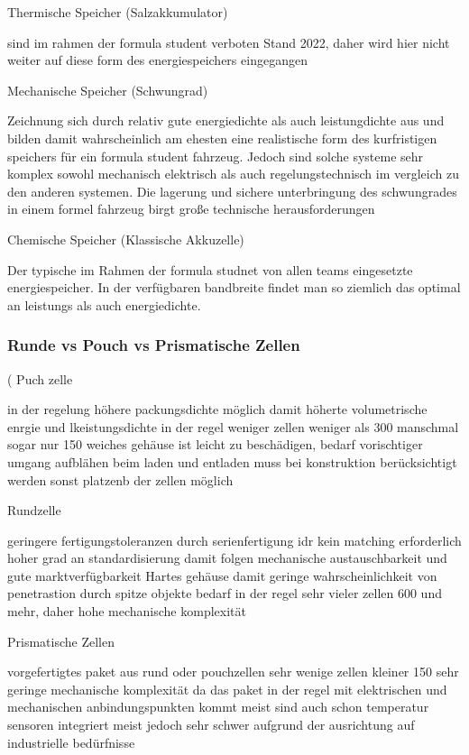 Thermische Speicher (Salzakkumulator)

	sind im rahmen der formula student verboten Stand 2022, daher wird hier nicht weiter auf diese form des energiespeichers eingegangen

Mechanische Speicher (Schwungrad)

	Zeichnung sich durch relativ gute energiedichte als auch leistungdichte aus und bilden damit wahrscheinlich am ehesten eine realistische form des kurfristigen speichers für ein formula student fahrzeug. Jedoch sind solche systeme sehr komplex sowohl mechanisch elektrisch als auch regelungstechnisch im vergleich zu den anderen systemen. Die lagerung und sichere unterbringung des schwungrades in einem formel fahrzeug birgt große technische herausforderungen

Chemische Speicher (Klassische Akkuzelle)

	Der typische im Rahmen der formula studnet von allen teams eingesetzte energiespeicher. In der verfügbaren bandbreite findet man so ziemlich das optimal an leistungs als auch energiedichte.

\subsubsection{Runde vs Pouch vs Prismatische Zellen}
(
	Puch zelle

in der regelung höhere packungsdichte möglich damit höherte volumetrische enrgie und lkeistungsdichte
in der regel weniger zellen weniger als 300 manschmal sogar nur 150
weiches gehäuse ist leicht zu beschädigen, bedarf vorischtiger umgang 
aufblähen beim laden und entladen muss bei konstruktion berücksichtigt werden sonst platzenb der zellen möglich


Rundzelle

geringere fertigungstoleranzen durch serienfertigung idr kein matching erforderlich
hoher grad an standardisierung damit folgen mechanische austauschbarkeit und gute marktverfügbarkeit
Hartes gehäuse damit geringe wahrscheinlichkeit von penetrastion durch spitze objekte
bedarf in der regel sehr vieler zellen 600 und mehr, daher hohe mechanische komplexität

Prismatische Zellen

vorgefertigtes paket aus rund oder pouchzellen
sehr wenige zellen kleiner 150
sehr geringe mechanische komplexität da das paket in der regel mit elektrischen und mechanischen anbindungspunkten kommt meist sind auch schon temperatur sensoren integriert
meist jedoch sehr schwer aufgrund der ausrichtung auf industrielle bedürfnisse


